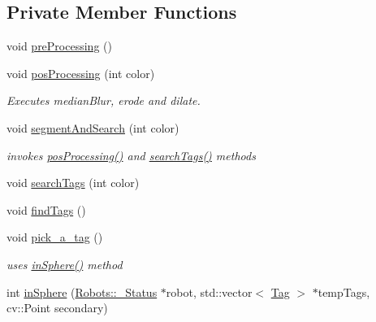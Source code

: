 \subsection*{Private Member Functions}
\begin{DoxyCompactItemize}
\item 
void \hyperlink{class_vision_a6d23298e695a938d2491ae1f6264c694}{pre\+Processing} ()
\item 
void \hyperlink{class_vision_af00cb00dca3916c4beebbd140ec8b153}{pos\+Processing} (int color)
\begin{DoxyCompactList}\small\item\em Executes median\+Blur, erode and dilate. \end{DoxyCompactList}\item 
void \hyperlink{class_vision_a0e43481439b4b670f5dd66caefa09494}{segment\+And\+Search} (int color)
\begin{DoxyCompactList}\small\item\em invokes \hyperlink{class_vision_af00cb00dca3916c4beebbd140ec8b153}{pos\+Processing()} and \hyperlink{class_vision_a717cabba99a7e8d5613df6dc699e31fe}{search\+Tags()} methods \end{DoxyCompactList}\item 
void \hyperlink{class_vision_a717cabba99a7e8d5613df6dc699e31fe}{search\+Tags} (int color)
\item 
void \hyperlink{class_vision_a7321350b5ea7648219a4cd4f0f7ca48e}{find\+Tags} ()
\item 
void \hyperlink{class_vision_ada61d6f3bfc003a8e0e49bb5ee3516a3}{pick\+\_\+a\+\_\+tag} ()
\begin{DoxyCompactList}\small\item\em uses \hyperlink{class_vision_a52fc530a0beea6bc8821cb83c5ae2cc5}{in\+Sphere()} method \end{DoxyCompactList}\item 
int \hyperlink{class_vision_a52fc530a0beea6bc8821cb83c5ae2cc5}{in\+Sphere} (\hyperlink{struct_robots_1_1___status}{Robots\+::\+\_\+\+Status} $\ast$robot, std\+::vector$<$ \hyperlink{class_tag}{Tag} $>$ $\ast$temp\+Tags, cv\+::\+Point secondary)
\end{DoxyCompactItemize}
